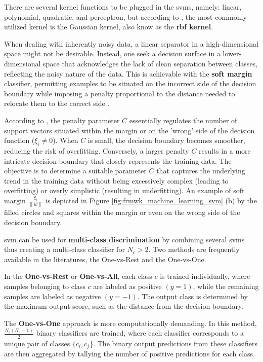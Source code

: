 There are several kernel functions to be plugged in the \gls{svm}s, namely: linear, polynomial, quadratic, and perceptron, but according to \textcite{Goodfellow2016}, the most commonly utilized kernel is the Gaussian kernel, also know as the \textbf{\gls{rbf} kernel}.

When dealing with inherently noisy data, a linear separator in a high-dimensional space might not be desirable. Instead, one seek a decision surface in a lower-dimensional space that acknowledges the lack of clean separation between classes, reflecting the noisy nature of the data. This is achievable with the \textbf{soft margin} classifier, permitting examples to be situated on the incorrect side of the decision boundary while imposing a penalty proportional to the distance needed to relocate them to the correct side \cite{Russel2010}.

According to \textcite{Rothmund2018}, the penalty parameter $C$ essentially regulates the number of support vectors situated within the margin or on the 'wrong' side of the decision function ($\xi_i \neq 0$). When $C$ is small, the decision boundary becomes smoother, reducing the risk of overfitting. Conversely, a larger penalty $C$ results in a more intricate decision boundary that closely represents the training data. The objective is to determine a suitable parameter $C$ that captures the underlying trend in the training data without being excessively complex (leading to overfitting) or overly simplistic (resulting in underfitting). An example of soft margin $\frac{\xi_i}{\parallel w \parallel}$ is depicted in Figure \ref{fig:frmwk_machine_learning_svm} (b) by the filled circles and squares within the margin or even on the wrong side of the decision boundary.

\gls{svm} can be used for \textbf{multi-class discrimination} by combining several \gls{svm}s thus creating a multi-class classifier for $N_c > 2$. Two methods are frequently available in the literatures, the One-vs-Rest and the One-vs-One.

In the \textbf{One-vs-Rest} or \textbf{One-vs-All}, each class $c$ is trained individually, where samples belonging to class $c$ are labeled as positive $(y = 1)$, while the remaining samples are labeled as negative $(y = -1)$. The output class is determined by the maximum output score, such as the distance from the decision boundary.

The \textbf{One-vs-One} approach is more computationally demanding. In this method, $\frac{N_c(N_c-1)}{2}$ binary classifiers are trained, where each classifier corresponds to a unique pair of classes \{$c_i, c_j$\}. The binary output predictions from these classifiers are then aggregated by tallying the number of positive predictions for each class.

